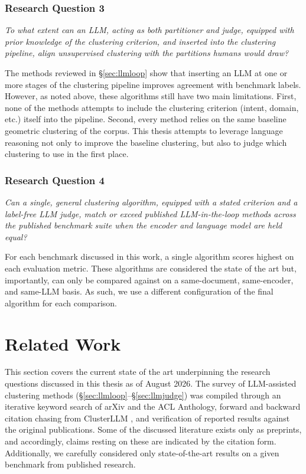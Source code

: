 \documentclass[11pt,a4paper,oneside]{report}
\begin{document}
\subsection{Research Question 3}

\emph{To what extent can an LLM, acting as both partitioner and judge, equipped with prior knowledge of the clustering criterion, and inserted into the clustering pipeline, align unsupervised clustering with the partitions humans would draw?}

\vspace{\baselineskip}

The methods reviewed in \S\ref{sec:llmloop} show that inserting an LLM at one or more stages of the clustering pipeline improves agreement with benchmark labels. However, as noted above, these algorithms still have two main limitations. First, none of the methods attempts to include the clustering criterion (intent, domain, etc.) itself into the pipeline. Second, every method relies on the same baseline geometric clustering of the corpus. This thesis attempts to leverage language reasoning not only to improve the baseline clustering, but also to judge which clustering to use in the first place.

\subsection{Research Question 4}

\emph{Can a single, general clustering algorithm, equipped with a stated criterion and a label-free LLM judge, match or exceed published LLM-in-the-loop methods across the published benchmark suite when the encoder and language model are held equal?}

\vspace{\baselineskip}

For each benchmark discussed in this work, a single algorithm scores highest on each evaluation metric. These algorithms are considered the state of the art but, importantly, can only be compared against on a same-document, same-encoder, and same-LLM basis. As such, we use a different configuration of the final algorithm for each comparison.

\chapter{Related Work}\label{ch:litreview}

This section covers the current state of the art underpinning the research questions discussed in this thesis as of August 2026. The survey of LLM-assisted clustering methods (\S\ref{sec:llmloop}--\S\ref{sec:llmjudge}) was compiled through an iterative keyword search of arXiv and the ACL Anthology, forward and backward citation chasing from ClusterLLM \citep{zhang2023clusterllm}, and verification of reported results against the original publications. Some of the discussed literature exists only as preprints, and accordingly, claims resting on these are indicated by the citation form. Additionally, we carefully considered only state-of-the-art results on a given benchmark from published research.
\end{document}
